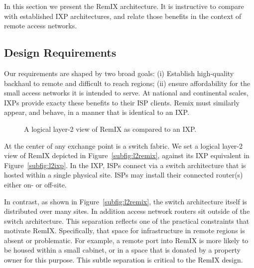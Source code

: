 In this section we present the RemIX architecture. It is instructive to compare with established IXP architectures, and relate those benefits in the context of remote access networks.

\subsection{Design Requirements}

Our requirements are shaped by two broad goals: (i) Establish high-quality
backhaul to remote and difficult to reach regions; (ii) ensure affordability
for the small access networks it is intended to serve. At national and
continental scales, IXPs provide exacty these benefits to their ISP clients. Remix must similarly appear, and behave, in a manner that is identical to an IXP.

\begin{figure}
\centering
   \hfill
 \caption{A logical layer-2 view of RemIX as compared to an IXP.}
\label{fig:l2}
\end{figure}

At the center of any exchange point is a switch fabric. We set a logical layer-2
view of RemIX depicted in Figure~\ref{subfig:l2remix}, against its IXP
equivalent in Figure~\ref{subfig:l2ixp}. In the IXP, ISPs connect via a switch
architecture that is hosted within a single physical site. ISPs may install
their connected router(s) either on- or off-site.

In contrast, as shown in Figure~\ref{subfig:l2remix}, the switch architecture
itself is distributed over many sites. In addition access network routers sit
outside of the switch architecture. This separation reflects one of the
practical constraints that motivate RemIX. Specifically, that space for
infrastructure in remote regions is absent or problematic. For example, a remote
port into RemIX is more likely to be housed within a small cabinet, or in a
space that is donated by a property owner for this purpose. This subtle separation is critical to the RemIX design. 


